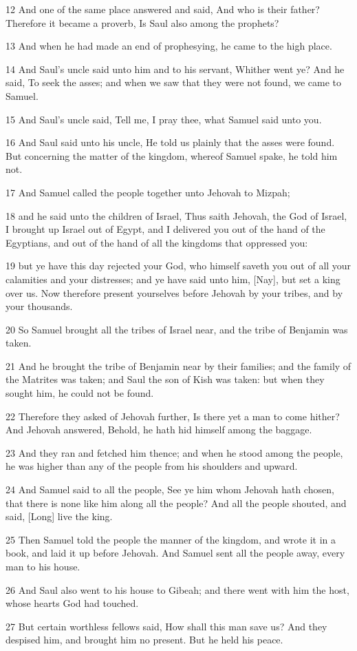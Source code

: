\par 12 And one of the same place answered and said, And who is their father? Therefore it became a proverb, Is Saul also among the prophets?
\par 13 And when he had made an end of prophesying, he came to the high place.
\par 14 And Saul's uncle said unto him and to his servant, Whither went ye? And he said, To seek the asses; and when we saw that they were not found, we came to Samuel.
\par 15 And Saul's uncle said, Tell me, I pray thee, what Samuel said unto you.
\par 16 And Saul said unto his uncle, He told us plainly that the asses were found. But concerning the matter of the kingdom, whereof Samuel spake, he told him not.
\par 17 And Samuel called the people together unto Jehovah to Mizpah;
\par 18 and he said unto the children of Israel, Thus saith Jehovah, the God of Israel, I brought up Israel out of Egypt, and I delivered you out of the hand of the Egyptians, and out of the hand of all the kingdoms that oppressed you:
\par 19 but ye have this day rejected your God, who himself saveth you out of all your calamities and your distresses; and ye have said unto him, [Nay], but set a king over us. Now therefore present yourselves before Jehovah by your tribes, and by your thousands.
\par 20 So Samuel brought all the tribes of Israel near, and the tribe of Benjamin was taken.
\par 21 And he brought the tribe of Benjamin near by their families; and the family of the Matrites was taken; and Saul the son of Kish was taken: but when they sought him, he could not be found.
\par 22 Therefore they asked of Jehovah further, Is there yet a man to come hither? And Jehovah answered, Behold, he hath hid himself among the baggage.
\par 23 And they ran and fetched him thence; and when he stood among the people, he was higher than any of the people from his shoulders and upward.
\par 24 And Samuel said to all the people, See ye him whom Jehovah hath chosen, that there is none like him along all the people? And all the people shouted, and said, [Long] live the king.
\par 25 Then Samuel told the people the manner of the kingdom, and wrote it in a book, and laid it up before Jehovah. And Samuel sent all the people away, every man to his house.
\par 26 And Saul also went to his house to Gibeah; and there went with him the host, whose hearts God had touched.
\par 27 But certain worthless fellows said, How shall this man save us? And they despised him, and brought him no present. But he held his peace.

